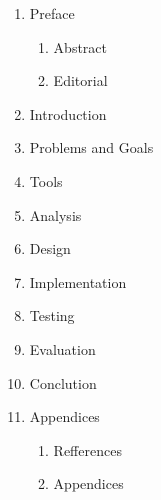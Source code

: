 \documentclass[../main.tex]{subfiles}
\begin{document}
\begin{enumerate}
	\item Preface
	\begin{enumerate}
		\item Abstract
		\item Editorial
	\end{enumerate}
	\item Introduction
	\item Problems and Goals
	\item Tools
	\item Analysis
	\item Design 
	\item Implementation
	\item Testing
	\item Evaluation
	\item Conclution
	\item Appendices
	\begin{enumerate}
		\item Refferences
		\item Appendices
	\end{enumerate}
\end{enumerate}
\end{document}
